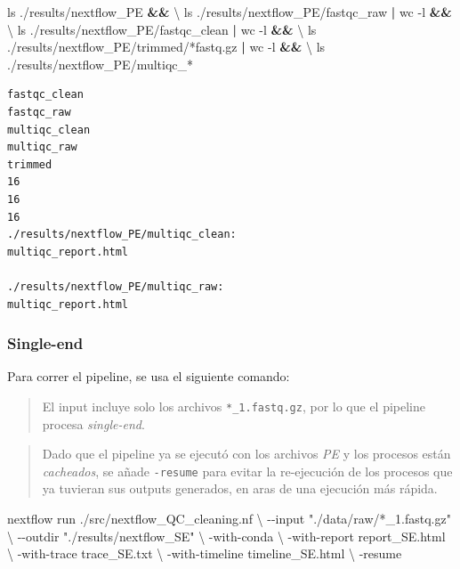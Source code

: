\documentclass[
  letterpaper,
  DIV=11,
  numbers=noendperiod]{scrartcl}
\newenvironment{Shaded}{\begin{snugshade}}{\end{snugshade}}
\newcommand{\AttributeTok}[1]{\textcolor[rgb]{0.40,0.45,0.13}{#1}}
\newcommand{\DataTypeTok}[1]{\textcolor[rgb]{0.68,0.00,0.00}{#1}}
\newcommand{\ExtensionTok}[1]{\textcolor[rgb]{0.00,0.23,0.31}{#1}}
\newcommand{\FunctionTok}[1]{\textcolor[rgb]{0.28,0.35,0.67}{#1}}
\newcommand{\KeywordTok}[1]{\textcolor[rgb]{0.00,0.23,0.31}{\textbf{#1}}}
\newcommand{\NormalTok}[1]{\textcolor[rgb]{0.00,0.23,0.31}{#1}}
\newcommand{\PreprocessorTok}[1]{\textcolor[rgb]{0.68,0.00,0.00}{#1}}
\newcommand{\StringTok}[1]{\textcolor[rgb]{0.13,0.47,0.30}{#1}}
\begin{document}
\begin{Shaded}
\begin{Highlighting}[]
\FunctionTok{ls}\NormalTok{ ./results/nextflow\_PE }\KeywordTok{\&\&} \DataTypeTok{\textbackslash{}}
\FunctionTok{ls}\NormalTok{ ./results/nextflow\_PE/fastqc\_raw }\KeywordTok{|} \FunctionTok{wc} \AttributeTok{{-}l} \KeywordTok{\&\&} \DataTypeTok{\textbackslash{}}
\FunctionTok{ls}\NormalTok{ ./results/nextflow\_PE/fastqc\_clean }\KeywordTok{|} \FunctionTok{wc} \AttributeTok{{-}l} \KeywordTok{\&\&} \DataTypeTok{\textbackslash{}}
\FunctionTok{ls}\NormalTok{ ./results/nextflow\_PE/trimmed/}\PreprocessorTok{*}\NormalTok{fastq.gz }\KeywordTok{|} \FunctionTok{wc} \AttributeTok{{-}l} \KeywordTok{\&\&} \DataTypeTok{\textbackslash{}}
\FunctionTok{ls}\NormalTok{ ./results/nextflow\_PE/multiqc\_}\PreprocessorTok{*}
\end{Highlighting}
\end{Shaded}

\begin{verbatim}
fastqc_clean
fastqc_raw
multiqc_clean
multiqc_raw
trimmed
16
16
16
./results/nextflow_PE/multiqc_clean:
multiqc_report.html

./results/nextflow_PE/multiqc_raw:
multiqc_report.html
\end{verbatim}

\subsubsection{Single-end}\label{single-end}

Para correr el pipeline, se usa el siguiente comando:

\begin{quote}
El input incluye solo los archivos \texttt{*\_1.fastq.gz}, por lo que el
pipeline procesa \emph{single-end}.
\end{quote}

\begin{quote}
Dado que el pipeline ya se ejecutó con los archivos \emph{PE} y los
procesos están \emph{cacheados}, se añade \texttt{-resume} para evitar
la re-ejecución de los procesos que ya tuvieran sus outputs generados,
en aras de una ejecución más rápida.
\end{quote}

\begin{Shaded}
\begin{Highlighting}[]
\ExtensionTok{nextflow}\NormalTok{ run ./src/nextflow\_QC\_cleaning.nf }\DataTypeTok{\textbackslash{}}
  \AttributeTok{{-}{-}input} \StringTok{"./data/raw/*\_1.fastq.gz"} \DataTypeTok{\textbackslash{}}
  \AttributeTok{{-}{-}outdir} \StringTok{"./results/nextflow\_SE"} \DataTypeTok{\textbackslash{}}
  \AttributeTok{{-}with{-}conda} \DataTypeTok{\textbackslash{}}
  \AttributeTok{{-}with{-}report}\NormalTok{ report\_SE.html }\DataTypeTok{\textbackslash{}}
  \AttributeTok{{-}with{-}trace}\NormalTok{ trace\_SE.txt }\DataTypeTok{\textbackslash{}}
  \AttributeTok{{-}with{-}timeline}\NormalTok{ timeline\_SE.html }\DataTypeTok{\textbackslash{}}
  \AttributeTok{{-}resume}
\end{Highlighting}
\end{Shaded}
\end{document}
